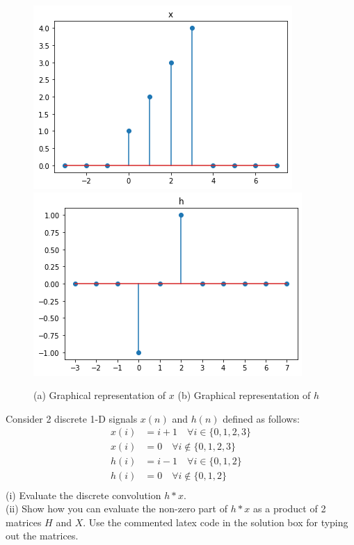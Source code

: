\documentclass[answers]{exam}
\begin{document}
\begin{figure}[h]
    \centering
    \includegraphics[width=0.3\linewidth]{Images/x.png}
    \includegraphics[width=0.31\linewidth]{Images/h.png}
    \caption{(a) Graphical representation of $x$ (b) Graphical representation of $h$}
    \label{fig:my_label}
\end{figure}
Consider 2 discrete 1-D signals $x(n)$ and $h(n)$ defined as follows:  
\begin{equation}
    \begin{aligned}
    x(i) &= i + 1 \quad \forall i \in \{0,1,2,3\} \\
    x(i) &= 0 \quad \forall i \not\in \{0,1,2,3\}\\
    h(i) &= i - 1 \quad \forall i \in \{0,1,2\} \\
    h(i) &= 0 \quad \forall i \not\in \{0,1,2\}\\
    \end{aligned}
\end{equation}
(i) Evaluate the discrete convolution $h * x$. \\
(ii) Show how you can evaluate the non-zero part of $h * x$ as a product of 2 matrices $H$ and $X$. Use the commented latex code in the solution box for typing out the matrices. 
\end{document}
